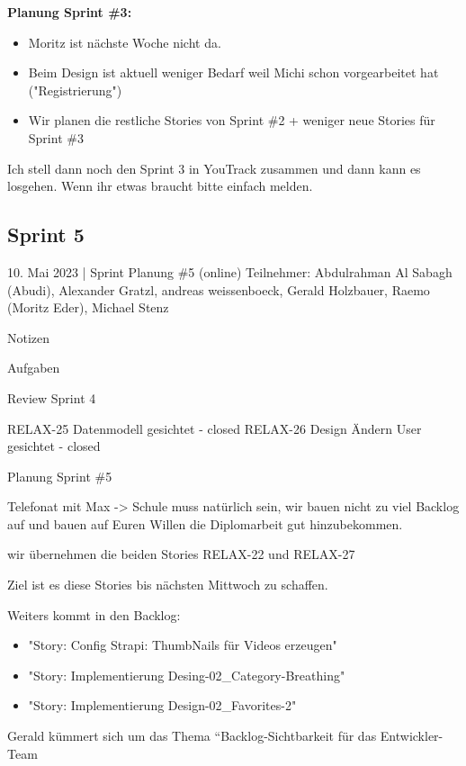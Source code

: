 \textbf{Planung Sprint \#3:}

\begin{itemize}
    \item Moritz ist nächste Woche nicht da.
    \item Beim Design ist aktuell weniger Bedarf weil Michi schon vorgearbeitet hat ("Registrierung")
    \item Wir planen die restliche Stories von Sprint \#2 + weniger neue Stories für Sprint \#3



\end{itemize}

Ich stell dann noch den Sprint 3 in YouTrack zusammen und dann kann es losgehen.
Wenn ihr etwas braucht bitte einfach melden.

\subsection{Sprint 5}
10. Mai 2023 | Sprint Planung \#5 (online)
Teilnehmer: Abdulrahman Al Sabagh (Abudi), Alexander Gratzl, andreas weissenboeck, Gerald Holzbauer, Raemo (Moritz Eder), Michael Stenz

Notizen



Aufgaben




Review Sprint 4

RELAX-25 Datenmodell gesichtet - closed
RELAX-26 Design Ändern User gesichtet - closed


Planung Sprint \#5

Telefonat mit Max -> Schule muss natürlich sein, wir bauen nicht zu viel Backlog auf und bauen auf Euren Willen die Diplomarbeit gut hinzubekommen.

wir übernehmen die beiden Stories RELAX-22 und RELAX-27

Ziel ist es diese Stories bis nächsten Mittwoch zu schaffen.

Weiters kommt in den Backlog:
\begin{itemize}
    \item "Story: Config Strapi: ThumbNails für Videos erzeugen"
    \item "Story: Implementierung Desing-02\_Category-Breathing"
    \item "Story: Implementierung Design-02\_Favorites-2"

\end{itemize}

Gerald kümmert sich um das Thema “Backlog-Sichtbarkeit für das Entwickler-Team

